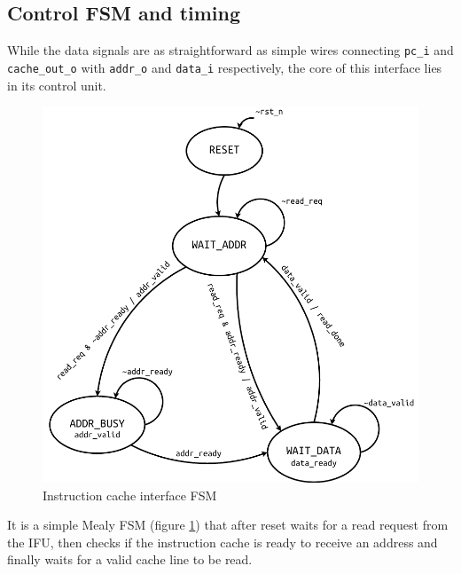 \subsection{Control \acs{FSM} and timing}
While the data signals are as straightforward as simple wires connecting \texttt{pc\_i} and \texttt{cache\_out\_o} with \texttt{addr\_o} and \texttt{data\_i} respectively, the core of this interface lies in its control unit.
\begin{figure}[hbt]
  \centering
  \includegraphics[scale=.8]{img/icache_ifc_fsm.pdf}
  \caption{Instruction cache interface \acs{FSM}}
  \label{fig:icache_ifc_fsm}
\end{figure}
It is a simple Mealy \acs{FSM} (figure \ref{fig:icache_ifc_fsm}) that after reset waits for a read request from the \ac{IFU}, then checks if the instruction cache is ready to receive an address and finally waits for a valid cache line to be read.

